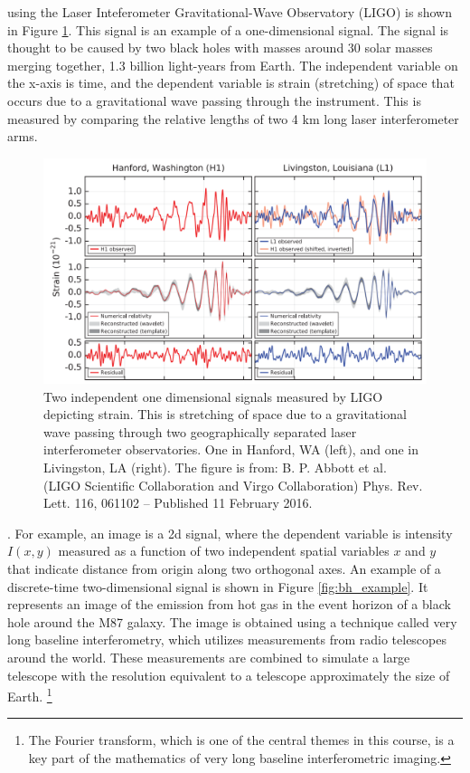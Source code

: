  using the 
Laser Inteferometer Gravitational-Wave Observatory (LIGO) is shown in Figure \ref{fig:ligo_meas}. 
This signal is an example of a one-dimensional signal. The signal is thought to be 
caused by two black holes with masses around 30 solar masses merging together, 1.3 billion 
light-years from Earth. The independent variable on the x-axis is time, and the dependent 
variable is strain (stretching) of space that occurs due to a gravitational wave passing 
through the instrument. This is measured by comparing the relative lengths of two 
4 km long laser interferometer arms.

\begin{figure}
   \begin{center}
      \includegraphics[width=\textwidth]{ch04/figures/dc_fg.png}
   \end{center}
   \caption{Two independent one dimensional signals measured by LIGO depicting strain. 
   This is stretching of space due to a gravitational wave passing through two geographically 
   separated laser interferometer observatories. One in Hanford, WA (left), and one in 
   Livingston, LA (right). The figure is from: B. P. Abbott et al. 
   (LIGO Scientific Collaboration and Virgo Collaboration) Phys. Rev. Lett. 116, 061102 – Published 11
      February 2016.}
   \label{fig:ligo_meas}
\end{figure}

. For example, an image is a 2d signal, 
where the dependent variable is intensity $I(x,y)$ measured as a function of two independent 
spatial variables $x$ and $y$ that indicate distance from origin along two orthogonal axes. 
An example of a discrete-time two-dimensional signal is shown in Figure \ref{fig:bh_example}.
It represents an image of the emission from hot gas in the event horizon of a black hole around the M87 galaxy.
The image is obtained using a technique called very long baseline interferometry, 
which utilizes measurements from radio telescopes around the world.
These measurements are combined to simulate a large telescope with the resolution 
equivalent to a telescope approximately the size of Earth.
\footnote{The Fourier transform, which is one of the central themes in this course, 
is a key part of the mathematics of very long baseline interferometric imaging.}

